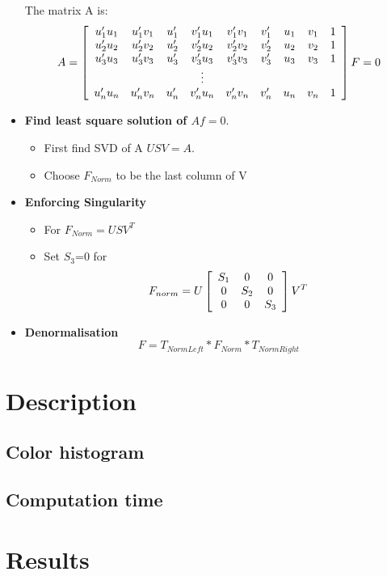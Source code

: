 \documentclass[a4paper,12pt]{article}
\begin{document}
\begin{itemize}
        The matrix A is: \begin{equation}
            A = \left[ 
            \begin{array}[ ]{ccccccccc}
                u'_1u_1 & u'_1v_1 & u'_1 & v'_1u_1 &v'_1v_1 & v'_1 & u_1 & v_1 & 1 \\
                u'_2u_2 & u'_2v_2 & u'_2 & v'_2u_2 &v'_2v_2 & v'_2 & u_2 & v_2 & 1 \\
                u'_3u_3 & u'_3v_3 & u'_3 & v'_3u_3 &v'_3v_3 & v'_3 & u_3 & v_3 & 1 \\
                &&& \vdots \\
                u'_nu_n & u'_nv_n & u'_n & v'_nu_n &v'_nv_n & v'_n & u_n & v_n & 1 
            \end{array}
            \right] F = 0
        \end{equation}
    \item \textbf{Find least square solution of $Af = 0$}. 
        \begin{itemize}
            \item First find SVD of A $USV = A$. 
            \item Choose $F_{Norm}$ to be the last column of V
        \end{itemize}
    \item \textbf{Enforcing Singularity} 
        \begin{itemize}
            \item For $F_{Norm}=USV^T$ 
            \item Set $S_3$=0 for 
            \begin{equation}
                       F_{norm} =U \left[ 
            \begin{array}[]{ccc}
                        S_1 & 0 & 0 \\
                        0 & S_2  & 0 \\
                        0 & 0 & S_3 
                    \end{array}
            \right] V^T
            \end{equation}
        \end{itemize}
    \item \textbf{Denormalisation}
    	\begin{equation}
    	F=T_{NormLeft}*F_{Norm}*T_{NormRight}
    	\end{equation}
    \end{itemize}
 

\section{Description}

\subsection{Color histogram}

\subsection{Computation time}

\section{Results}
\end{document}
